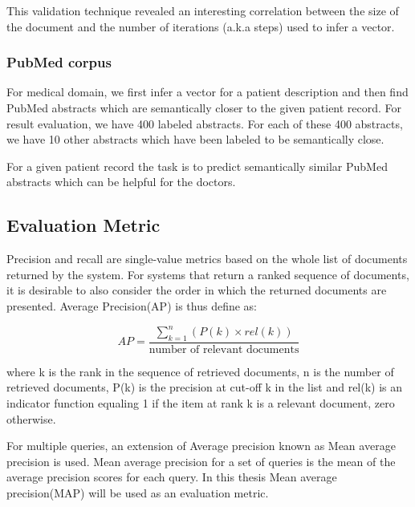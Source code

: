 \documentclass[12pt,a4paper] {article}
\begin{document}
This validation technique revealed an interesting correlation between the size of the document and the number of iterations (a.k.a steps)  used to infer a vector.

\subsubsection*{PubMed corpus}

For medical domain, we first infer a vector for a patient description and then find PubMed abstracts which are semantically closer to the given patient record.
For result evaluation, we have 400 labeled abstracts. For each of these 400 abstracts, we have 10 other abstracts which have been labeled to be semantically close. 

For a given patient record the task is to predict semantically similar PubMed abstracts which can be helpful for the doctors.



\subsection*{Evaluation Metric}
Precision and recall are single-value metrics based on the whole list of documents returned by the system. For systems that return a ranked sequence of documents, it is desirable to also consider the order in which the returned documents are presented. Average Precision(AP) is thus define as:

\begin{equation}
AP =\frac {\sum_{k=1}^{n}(P(k)\times rel (k))}{\mbox {number of relevant documents}}
\end{equation}

where k is the rank in the sequence of retrieved documents,  n is the number of retrieved documents,  P(k) is the precision at cut-off k in the list and rel(k) is an indicator function equaling 1 if the item at rank k is a relevant document, zero otherwise.

For multiple queries, an extension of Average precision known as Mean average precision is used. Mean average precision for a set of queries is the mean of the average precision scores for each query. In this thesis Mean average precision(MAP) will be used as an evaluation metric.


 
\end{document}
